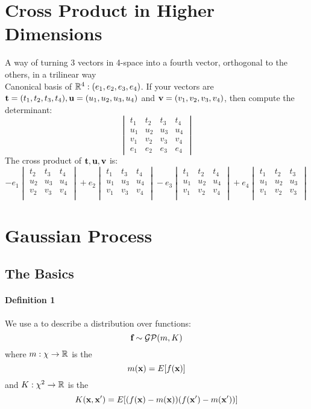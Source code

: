 \documentclass[11pt]{article}
\begin{document}
	\section{Cross Product in Higher Dimensions}
	A way of turning 3 vectors in 4-space into a fourth vector, orthogonal to the others, in a trilinear way \\
	Canonical basis of $\mathbb{R}^4: (e_1, e_2, e_3, e_4)$. If your vectors are $\textbf{t} = (t_1, t_2, t_3, t_4), \textbf{u} = (u_1, u_2, u_3, u_4)$ and $\textbf{v} = (v_1, v_2, v_3, v_4)$, then compute the determinant:
	$$\begin{vmatrix}
	t_1 & t_2 & t_3 & t_4 \\
	u_1 & u_2 & u_3 & u_4 \\
	v_1 & v_2 & v_3 & v_4 \\
	e_1 & e_2 & e_3 & e_4
	\end{vmatrix}$$
	The cross product of $\textbf{t}, \textbf{u}, \textbf{v}$ is:
		$$-e_1\begin{vmatrix}
	 t_2 & t_3 & t_4 \\
	 u_2 & u_3 & u_4 \\
	 v_2 & v_3 & v_4 \\
	\end{vmatrix}
	+e_2\begin{vmatrix}
	t_1 & t_3 & t_4 \\
	u_1 & u_3 & u_4 \\
	v_1 & v_3 & v_4 \\
	\end{vmatrix}
	- e_3\begin{vmatrix}
	t_1 & t_2 & t_4 \\
	u_1 & u_2 & u_4 \\
	v_1 & v_2 & v_4 \\
	\end{vmatrix}
	+ e_4\begin{vmatrix}
	t_1 & t_2 & t_3 \\
	u_1 & u_2 & u_3 \\
	v_1 & v_2 & v_3 \\
	\end{vmatrix}
	$$
\section{Gaussian Process}
\subsection{The Basics}
\paragraph{Definition 1}
We use a  to describe a distribution over functions:
$$\textbf{f} \sim \mathcal{GP}(m, K)$$ 
where $m: \chi \rightarrow \mathbb{R}$ is the 
$$m(\textbf{x}) = E[f(\textbf{x})]$$
and $K: \chi^2 \rightarrow \mathbb{R}$ is the 
$$K(\textbf{x}, \textbf{x}') = E[(f(\textbf{x}) - m(\textbf{x}))(f(\textbf{x}') - m(\textbf{x}'))]$$
\end{document}
